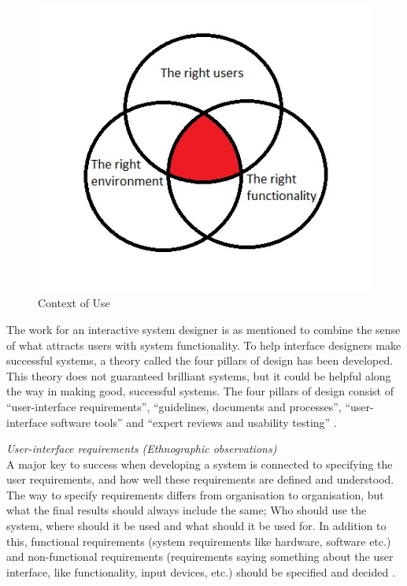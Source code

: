 \begin{figure} [ht!]
\centering
\includegraphics[scale=0.8]{contextOfUse.jpg}
\caption{Context of Use}
\label{contextofuse}
\end{figure}  
  

The work for an interactive system designer is as mentioned to combine the sense of what attracts users with system functionality. To help interface designers make successful systems, a theory called the four pillars of design has been developed. This theory does not guaranteed brilliant systems, but it could be helpful along the way in making good, successful systems. The four pillars of design consist of “user-interface requirements”, “guidelines, documents and processes”, “user-interface software tools” and “expert reviews and usability testing” \cite{mmi}.    

\emph{User-interface requirements (Ethnographic observations)}\\
A major key to success when developing a system is connected to specifying the user requirements, and how well these requirements are defined and understood.  The way to specify requirements differs from organisation to organisation, but what the final results should always include the same; Who should use the system, where should it be used and what should it be used for. In addition to this, functional requirements (system requirements like hardware,  software etc.) and non-functional requirements (requirements saying something about the user interface, like functionality, input devices, etc.) should be specified and decided \cite{mmi}.

